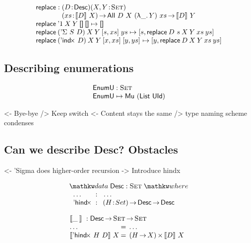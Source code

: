 \documentclass[preprint, authoryear, onecolumn]{sigplanconf}
\newenvironment{structure}{\footnotesize\verbatim}{\endverbatim}
\begin{document}
\[\stk{
\F{replace} : \stk{\PITEL{D}{\Desc}
                   \PITEL{X,Y}{\Set}\\
                   \PI{xs}{\descop{D}{X}} 
                   \All{D}{X}{(\LAM{\_}Y)}{xs} \To
                   \descop{D}{Y}} \\
\F{replace}\: \DUnit\:          X\: Y\: \Void\:          \Void          \mapsto \Void \\
\F{replace}\: (\DSigma{S}{D})\: X\: Y\: \pair{s}{xs}{}\: ys             \mapsto
    \pair{s}{\F{replace}\: {D~s}\: X\: Y\: xs\: ys}{}         \\
\F{replace}\: (\DIndx{D})\:     X\: Y\: \pair{x}{xs}{}\: \pair{y}{ys}{} \mapsto
    \pair{y}{\F{replace}\: D\: X\: Y\: xs\: ys}{}
}\]

\subsection{Describing enumerations}

\[\stk{
\EnumU : \Set \\
\EnumU \mapsto \Mu{(\List~\UId)}
}\]


\begin{structure}
<- Bye-bye \spi
    /> Keep switch
<- Content stays the same
    /> type naming scheme condenses
\end{structure}


\subsection{Can we describe Desc? Obstacles}

\begin{structure}
<- 'Sigma does higher-order recursion
    -> Introduce hindx
\end{structure}

\[
\stk{
\data \Desc : \Set \where \\
\;\;\begin{array}{@{}l@{\::\:\:}l@{\quad}l}
    \ldots          & \:\:\ldots \\
    \DHindx         & \PI{H}{Set} \Desc \To \Desc
\end{array}
}
\]

\[\stk{
\descop{\_\:}{} : \Desc \To \Set \To \Set \\
\begin{array}{@{}l@{\:=\:\:}ll}
\ldots                        &  \ldots \\
\descop{\DHindx{H}{D}}{X}     &  \TIMES{(H \To X)}{\descop{D}{X}}
\end{array}
}\]
\end{document}
